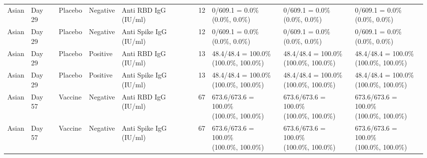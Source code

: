 \documentclass[]{book}
\theoremstyle{definition}
\theoremstyle{definition}
\theoremstyle{definition}
\newcommand{\1}{\mathbbm{1}}
\begin{document}
\begin{landscape}
\begin{ThreePartTable}
\begin{longtable}[t]{>{\raggedright\arraybackslash}p{2.7cm}llllllll}
\hspace{1em}Asian & Day 29 & Placebo & Negative & Anti RBD IgG (IU/ml) & 12 & \makecell[l]{0/609.1 = 0.0\%\\(0.0\%, 0.0\%)} & \makecell[l]{0/609.1 = 0.0\%\\(0.0\%, 0.0\%)} & \makecell[l]{0/609.1 = 0.0\%\\(0.0\%, 0.0\%)}\\
\hspace{1em}Asian & Day 29 & Placebo & Negative & Anti Spike IgG (IU/ml) & 12 & \makecell[l]{0/609.1 = 0.0\%\\(0.0\%, 0.0\%)} & \makecell[l]{0/609.1 = 0.0\%\\(0.0\%, 0.0\%)} & \makecell[l]{0/609.1 = 0.0\%\\(0.0\%, 0.0\%)}\\
\hspace{1em}Asian & Day 29 & Placebo & Positive & Anti RBD IgG (IU/ml) & 13 & \makecell[l]{48.4/48.4 = 100.0\%\\(100.0\%, 100.0\%)} & \makecell[l]{48.4/48.4 = 100.0\%\\(100.0\%, 100.0\%)} & \makecell[l]{48.4/48.4 = 100.0\%\\(100.0\%, 100.0\%)}\\
\hspace{1em}Asian & Day 29 & Placebo & Positive & Anti Spike IgG (IU/ml) & 13 & \makecell[l]{48.4/48.4 = 100.0\%\\(100.0\%, 100.0\%)} & \makecell[l]{48.4/48.4 = 100.0\%\\(100.0\%, 100.0\%)} & \makecell[l]{48.4/48.4 = 100.0\%\\(100.0\%, 100.0\%)}\\
\hspace{1em}Asian & Day 57 & Vaccine & Negative & Anti RBD IgG (IU/ml) & 67 & \makecell[l]{673.6/673.6 = 100.0\%\\(100.0\%, 100.0\%)} & \makecell[l]{673.6/673.6 = 100.0\%\\(100.0\%, 100.0\%)} & \makecell[l]{673.6/673.6 = 100.0\%\\(100.0\%, 100.0\%)}\\
\hspace{1em}Asian & Day 57 & Vaccine & Negative & Anti Spike IgG (IU/ml) & 67 & \makecell[l]{673.6/673.6 = 100.0\%\\(100.0\%, 100.0\%)} & \makecell[l]{673.6/673.6 = 100.0\%\\(100.0\%, 100.0\%)} & \makecell[l]{673.6/673.6 = 100.0\%\\(100.0\%, 100.0\%)}\\

\end{longtable}
\end{ThreePartTable}
\end{landscape}
\end{document}
